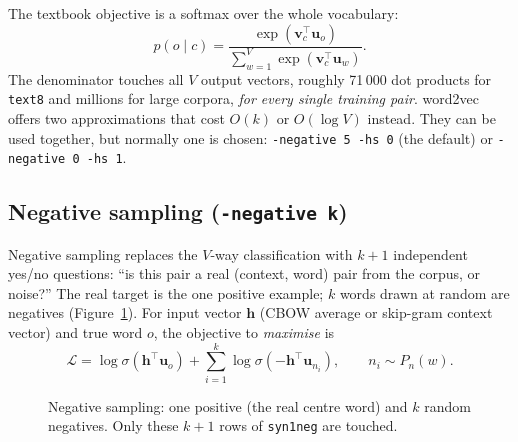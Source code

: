 \documentclass[11pt,a4paper]{article}
\newcommand{\code}[1]{\texttt{#1}}
\newcommand{\vin}{\mathbf{v}}
\newcommand{\vout}{\mathbf{u}}
\begin{document}
The textbook objective is a softmax over the whole vocabulary:
\[
  p(o \mid c) = \frac{\exp(\vin_c^{\top}\vout_o)}{\sum_{w=1}^{V}\exp(\vin_c^{\top}\vout_w)} .
\]
The denominator touches all $V$ output vectors, roughly 71\,000 dot products for
\code{text8} and millions for large corpora, \emph{for every single training pair}.
word2vec offers two approximations that cost $O(k)$ or $O(\log V)$ instead.
They can be used together, but normally one is chosen: \code{-negative 5 -hs 0}
(the default) or \code{-negative 0 -hs 1}.

\subsection{Negative sampling (\texttt{-negative k})}

Negative sampling replaces the $V$-way classification with $k+1$ independent
yes/no questions: ``is this pair a real (context, word) pair from the corpus, or
noise?'' The real target is the one positive example; $k$ words drawn at random
are negatives (Figure~\ref{fig:negsamp}). For input vector $\mathbf{h}$ (CBOW average
or skip-gram context vector) and true word $o$, the objective to \emph{maximise} is
\[
  \mathcal{L} = \log\sigma\!\left(\mathbf{h}^{\top}\vout_o\right)
  + \sum_{i=1}^{k}\log\sigma\!\left(-\mathbf{h}^{\top}\vout_{n_i}\right),
  \qquad n_i \sim P_n(w).
\]

\begin{figure}[ht]
\centering
{}
\caption{Negative sampling: one positive (the real centre word) and $k$ random
negatives. Only these $k+1$ rows of \code{syn1neg} are touched.}
\label{fig:negsamp}
\end{figure}
\end{document}
